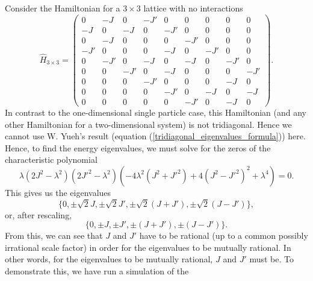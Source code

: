 \documentclass[a4paper, 10pt]{article}
\theoremstyle{plain}
\begin{document}
Consider the Hamiltonian for a $3\times3$ lattice with no interactions
\begin{equation}
    \hat{H}_{3\times3}
    =
    \begin{pmatrix}
         0  & -J  &  0  & -J' &  0  &  0  &  0  &  0  &  0  \\
        -J  &  0  & -J  &  0  & -J' &  0  &  0  &  0  &  0  \\
         0  & -J  &  0  &  0  &  0  & -J' &  0  &  0  &  0  \\
        -J' &  0  &  0  &  0  & -J  &  0  & -J' &  0  &  0  \\
         0  & -J' &  0  & -J  &  0  & -J  &  0  & -J' &  0  \\
         0  &  0  & -J' &  0  & -J  &  0  &  0  &  0  & -J' \\
         0  &  0  &  0  & -J' &  0  &  0  &  0  & -J  &  0  \\
         0  &  0  &  0  &  0  & -J' &  0  & -J  &  0  & -J  \\
         0  &  0  &  0  &  0  &  0  & -J' &  0  & -J  &  0
    \end{pmatrix}.
\end{equation}
In contrast to the one-dimensional single particle case, this Hamiltonian (and
any other Hamiltonian for a two-dimensional system) is not tridiagonal. Hence we cannot use
W. Yueh's result (equation (\ref{tridiagonal_eigenvalues_formula})) here.
Hence, to find the energy eigenvalues, we must solve for the zeros of the
characteristic polynomial
\begin{equation}
    \lambda \left ( 2 J^{2} - \lambda^{2} \right )
    \left ( 2 J'^{2} - \lambda^{2} \right )
    \left ( -4 \lambda^{2} \left ( J^{2} + J'^{2} \right )
    +
    4 \left ( J^{2} - J'^{2} \right )^{2}
    +
    \lambda^{4} \right )
    =
    0.
\end{equation}
This gives us the eigenvalues
\begin{equation*}
    \lbrace
        0, \pm\sqrt{2}J, \pm\sqrt{2}J', \pm \sqrt{2}(J+J'), \pm \sqrt{2}(J-J')
    \rbrace,
\end{equation*}
or, after rescaling,
\begin{equation*}
    \lbrace 0, \pm J, \pm J', \pm (J+J'), \pm (J-J') \rbrace.
\end{equation*}
From this, we can see that $J$ and $J'$ have to be rational (up to a common
possibly irrational scale factor) in order for the eigenvalues to be mutually
rational. In other words, for the eigenvalues to be mutually rational,
$J$ and $J'$ must be. To demonstrate this, we have run a simulation of the
\end{document}
